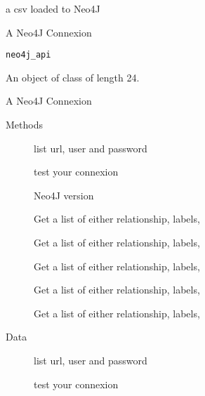 \documentclass[a4paper]{book}
\begin{document}
%
\begin{Value}
a csv loaded to Neo4J
\end{Value}
%
\begin{Description}\relax
A Neo4J Connexion
\end{Description}
%
\begin{Usage}
\begin{verbatim}
neo4j_api
\end{verbatim}
\end{Usage}
%
\begin{Format}
An object of class  of length 24.
\end{Format}
%
\begin{Value}
A Neo4J Connexion
\end{Value}
%
\begin{Section}{Methods}

\begin{description}

\item[] list url, user and password
\item[] test your connexion
\item[] Neo4J version
\item[] Get a list of either relationship, labels, 
\item[] Get a list of either relationship, labels, 
\item[] Get a list of either relationship, labels, 
\item[] Get a list of either relationship, labels, 
\item[] Get a list of either relationship, labels, 

\end{description}

\end{Section}
%
\begin{Section}{Data}

\begin{description}

\item[] list url, user and password
\item[] test your connexion

\end{description}

\end{Section}
\end{document}
